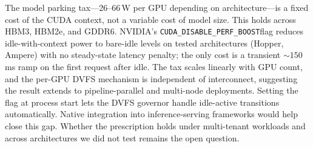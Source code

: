 \documentclass[sigconf,anonymous,review]{acmart}
\newcommand{\perfboost}{\texttt{CUDA\_\hspace{0pt}DISABLE\_\hspace{0pt}PERF\_\hspace{0pt}BOOST}}
\begin{document}
The model parking tax---26--66\,W per GPU depending on architecture---is a fixed cost of the CUDA context, not a variable cost of model size. This holds across HBM3, HBM2e, and GDDR6. NVIDIA's \perfboost flag reduces idle-with-context power to bare-idle levels on tested architectures (Hopper, Ampere) with no steady-state latency penalty; the only cost is a transient ${\sim}150$\,ms ramp on the first request after idle. The tax scales linearly with GPU count, and the per-GPU DVFS mechanism is independent of interconnect, suggesting the result extends to pipeline-parallel and multi-node deployments. Setting the flag at process start lets the DVFS governor handle idle-active transitions automatically. Native integration into inference-serving frameworks would help close this gap. Whether the prescription holds under multi-tenant workloads and across architectures we did not test remains the open question.
\end{document}
